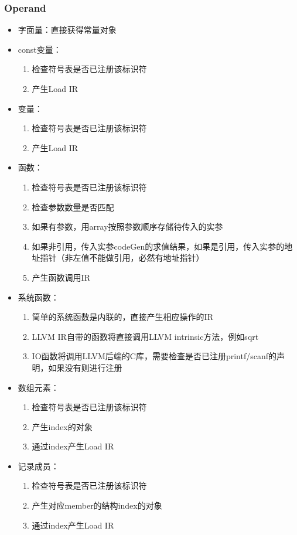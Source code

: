 \documentclass{article}
\begin{document}
\subsubsection{Operand}
\begin{itemize}
  \item 字面量：直接获得常量对象
  \item const变量：
  \begin{enumerate}
    \item 检查符号表是否已注册该标识符
    \item 产生Load IR
  \end{enumerate}
  \item 变量：
  \begin{enumerate}
    \item 检查符号表是否已注册该标识符
    \item 产生Load IR
  \end{enumerate}
  \item 函数：
  \begin{enumerate}
    \item 检查符号表是否已注册该标识符
    \item 检查参数数量是否匹配
    \item 如果有参数，用array按照参数顺序存储待传入的实参
    \item 如果非引用，传入实参codeGen的求值结果，如果是引用，传入实参的地址指针（非左值不能做引用，必然有地址指针）
    \item 产生函数调用IR
  \end{enumerate}
  \item 系统函数：
  \begin{enumerate}
    \item 简单的系统函数是内联的，直接产生相应操作的IR
    \item LLVM IR自带的函数将直接调用LLVM intrinsic方法，例如sqrt
    \item IO函数将调用LLVM后端的C库，需要检查是否已注册printf/scanf的声明，如果没有则进行注册
  \end{enumerate}
  \item 数组元素：
  \begin{enumerate}
    \item 检查符号表是否已注册该标识符
    \item 产生index的对象
    \item 通过index产生Load IR
  \end{enumerate}
  \item 记录成员：
  \begin{enumerate}
    \item 检查符号表是否已注册该标识符
    \item 产生对应member的结构index的对象
    \item 通过index产生Load IR
  \end{enumerate}
\end{itemize}
\end{document}
